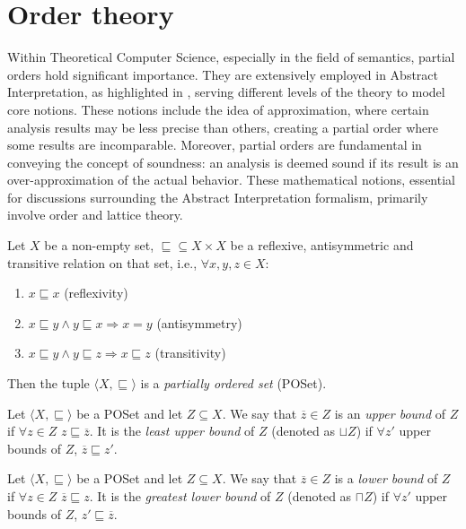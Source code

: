 \section{Order theory}
\label{sec:ordertheory}

Within Theoretical Computer Science, especially in the field of
semantics, partial orders hold significant importance. They are
extensively employed in Abstract Interpretation, as highlighted in
\cite{mine:course}, serving different levels of the theory to model
core notions. These notions include the idea of approximation, where
certain analysis results may be less precise than others, creating a
partial order where some results are incomparable. Moreover, partial
orders are fundamental in conveying the concept of soundness: an
analysis is deemed sound if its result is an over-approximation of the
actual behavior. These mathematical notions, essential for discussions
surrounding the Abstract Interpretation formalism, primarily involve
order and lattice theory.

\begin{definition}
  Let \(X\) be a non-empty set, \(\sqsubseteq \subseteq X \times X\)
  be a reflexive, antisymmetric and transitive relation on that set,
  i.e., \(\forall x,y,z \in X\):

  \begin{enumerate}
  \item \(x \sqsubseteq x\) (reflexivity)
  \item \(x \sqsubseteq y \wedge y \sqsubseteq x \Rightarrow x = y\)
    (antisymmetry)
  \item \(x \sqsubseteq y \wedge y \sqsubseteq z \Rightarrow x
    \sqsubseteq z\) (transitivity)
  \end{enumerate}

  Then the tuple \(\langle X, \sqsubseteq\rangle\) is a
  \emph{partially ordered set} (POSet).
\end{definition}

\begin{definition}
  Let \(\langle X, \sqsubseteq \rangle\) be a POSet and let
  \(Z \subseteq X\). We say that \(\overline{z} \in Z\) is an
  \emph{upper bound} of \(Z\) if \(\forall z \in Z\)
  \(z \sqsubseteq \overline{z}\). It is the \emph{least upper bound}
  of \(Z\) (denoted as \(\sqcup{Z}\)) if \(\forall z'\) upper bounds
  of \(Z\), \(\overline{z} \sqsubseteq z'\).
\end{definition}

\begin{definition}
  Let \(\langle X, \sqsubseteq \rangle\) be a POSet and let
  \(Z \subseteq X\). We say that \(\overline{z}\in Z\) is a
  \emph{lower bound} of \(Z\) if \(\forall z \in Z\)
  \(\overline{z} \sqsubseteq z\). It is the \emph{greatest lower
    bound} of \(Z\) (denoted as \(\sqcap{Z}\)) if \(\forall z'\) upper
  bounds of \(Z\), \(z' \sqsubseteq \overline{z}\).
\end{definition}

